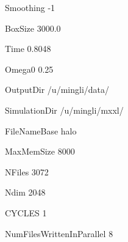 Smoothing -1

BoxSize 3000.0

Time    0.8048

Omega0  0.25

OutputDir /u/mingli/data/

SimulationDir /u/mingli/mxxl/

FileNameBase halo

MaxMemSize 8000

NFiles 3072

Ndim   2048

CYCLES 1

NumFilesWrittenInParallel 8


